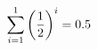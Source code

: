 \documentclass[preview]{standalone}
\begin{document}
\begin{align*}
\sum_{i=1}^{ 1 } \left({ 1 } \over {2} \right)^i = { 0.5 }
\end{align*}
\end{document}
